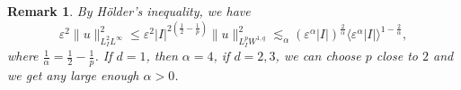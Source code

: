\documentclass[10pt,a4paper]{article}
\newtheorem{remark}[theorem]{Remark}
\begin{document}
  \begin{remark}
    By H\"older's inequality, we have
    \begin{equation}\label{uL2Linfty}
      \varepsilon^2 \|u\|_{L^2_I L^\infty}^2 \leq \varepsilon^2 |I|^{2(\frac12-\frac1p)}\|u\|_{L^p_I W^{1,q}}^2 
      \lesssim_{\alpha} {(\varepsilon^\alpha |I|)}^\frac2\alpha {\langle\varepsilon^\alpha |I|\rangle}^{1-\frac2\alpha},
    \end{equation}
    where \(\frac1\alpha=\frac12-\frac1p\). If \(d=1\), then \(\alpha=4\),
    if \(d=2,3\), we can choose \(p\) close to \(2\) and we get any large enough
    \(\alpha>0\).
  \end{remark}
  
\end{document}

